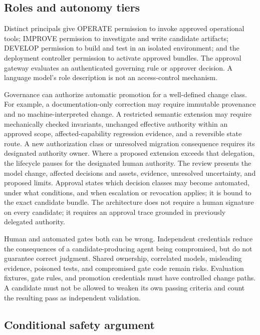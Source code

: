 \documentclass[preprint,12pt,authoryear]{elsarticle}
\begin{document}
\subsection{Roles and autonomy tiers}\label{roles-and-autonomy-tiers}

Distinct principals give OPERATE permission to invoke approved
operational tools; IMPROVE permission to investigate and write candidate
artifacts; DEVELOP permission to build and test in an isolated
environment; and the deployment controller permission to activate
approved bundles. The approval gateway evaluates an authenticated
governing rule or approver decision. A language model's role description
is not an access-control mechanism.

Governance can authorize automatic promotion for a well-defined change
class. For example, a documentation-only correction may require
immutable provenance and no machine-interpreted change. A restricted
semantic extension may require mechanically checked invariants,
unchanged effective authority within an approved scope,
affected-capability regression evidence, and a reversible state route. A
new authorization class or unresolved migration consequence requires its
designated authority owner. Where a proposed extension exceeds that
delegation, the lifecycle pauses for the designated human authority. The
review presents the model change, affected decisions and assets,
evidence, unresolved uncertainty, and proposed limits. Approval states
which decision classes may become automated, under what conditions, and
when escalation or revocation applies; it is bound to the exact
candidate bundle. The architecture does not require a human signature on
every candidate; it requires an approval trace grounded in previously
delegated authority.

Human and automated gates both can be wrong. Independent credentials
reduce the consequences of a candidate-producing agent being
compromised, but do not guarantee correct judgment. Shared ownership,
correlated models, misleading evidence, poisoned tests, and compromised
gate code remain risks. Evaluation fixtures, gate rules, and promotion
credentials must have controlled change paths. A candidate must not be
allowed to weaken its own passing criteria and count the resulting pass
as independent validation.

\subsection{Conditional safety
argument}\label{conditional-safety-argument}
\end{document}
